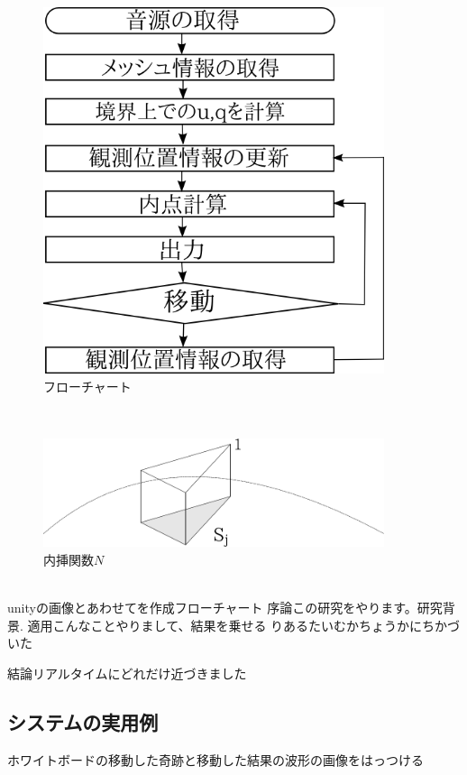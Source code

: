 \documentclass[dvipdfmx]{ampbt}
\begin{document}
\begin{figure}[H]
  \begin{center}
    \includegraphics[clip,width=10.0cm]{./png/flow.png}
    \caption{フローチャート}
    \label{fig:flow}
  \end{center}
\end{figure}\\
\begin{figure}[H]
  \begin{center}
    \includegraphics[clip,width=10.0cm]{./png/naisou_f.png}
    \caption{内挿関数$N$}
    \label{fig:naisou_f}
  \end{center}
\end{figure}\\


unityの画像とあわせてを作成フローチャート
序論この研究をやります。研究背景.
適用こんなことやりまして、結果を乗せる
りあるたいむかちょうかにちかづいた

結論リアルタイムにどれだけ近づきました

\subsection{システムの実用例}
ホワイトボードの移動した奇跡と移動した結果の波形の画像をはっつける
\end{document}

